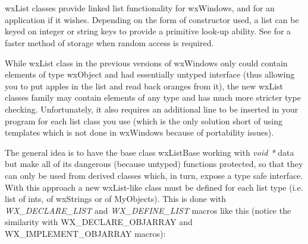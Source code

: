 \section{}\label{wxlist}

wxList classes provide linked list functionality for wxWindows, and for an
application if it wishes.  Depending on the form of constructor used, a list
can be keyed on integer or string keys to provide a primitive look-up ability.
See \rtfsp for a faster method of storage
when random access is required.

While wxList class in the previous versions of wxWindows only could contain
elements of type wxObject and had essentially untyped interface (thus allowing
you to put apples in the list and read back oranges from it), the new wxList
classes family may contain elements of any type and has much more stricter type
checking. Unfortunately, it also requires an additional line to be inserted in
your program for each list class you use (which is the only solution short of
using templates which is not done in wxWindows because of portability issues).

The general idea is to have the base class wxListBase working with {\it void *}
data but make all of its dangerous (because untyped) functions protected, so
that they can only be used from derived classes which, in turn, expose a type
safe interface. With this approach a new wxList-like class must be defined for
each list type (i.e. list of ints, of wxStrings or of MyObjects). This is done
with {\it WX\_DECLARE\_LIST} and {\it WX\_DEFINE\_LIST} macros like this
(notice the similarity with WX\_DECLARE\_OBJARRAY and WX\_IMPLEMENT\_OBJARRAY
macros):


